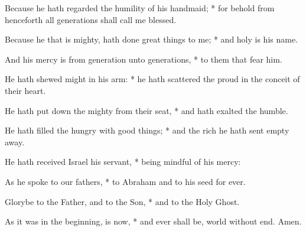 ﻿\setcounter{enumi}{2}
\item  Because he hath regarded the humility of his handmaid; * for behold from henceforth all generations shall call me blessed.
\item  Because he that is mighty, hath done great things to me; * and holy is his name.
\item  And his mercy is from generation unto generations, * to them that fear him.
\item  He hath shewed might in his arm: * he hath scattered the proud in the conceit of their heart.
\item  He hath put down the mighty from their seat, * and hath exalted the humble.
\item  He hath filled the hungry with good things; * and the rich he hath sent empty away.
\item  He hath received Israel his servant, * being mindful of his mercy:
\item  As he spoke to our fathers, * to Abraham and to his seed for ever.
\item  Glorybe to the Father, and to the Son, * and to the Holy Ghost.
\item  As it was in the beginning, is now, * and ever shall be, world without end. Amen.